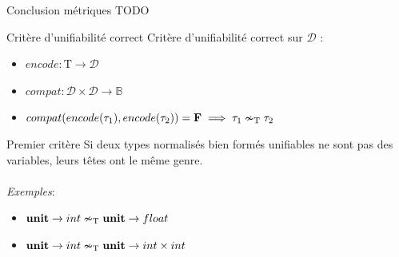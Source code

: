 \documentclass[serif]{beamer}
\newcommand{\exemples}{\textit{Exemples}\xspace}
\newcommand{\unit}{\bold{unit}}
\newcommand{\T}{\mathrm{T}}
\begin{document}

\begin{frame}{Conclusion métriques}
TODO
\end{frame}


\begin{frame}{Critère d'unifiabilité correct}
Critère d'unifiabilité correct sur $\mathscr{D}$ :
\begin{itemize}
	\item $encode : \T \rightarrow \mathscr{D}$
	\item $compat : \mathscr{D} \times \mathscr{D} \rightarrow \mathbb{B}$
	\item $compat (encode (\tau_1), encode (\tau_2)) = \bold{F} \implies \tau_1 \nsim_\T \tau_2$
\end{itemize}
\end{frame}


\begin{frame}{Premier critère}
Si deux types normalisés bien formés unifiables ne sont pas des variables, leurs têtes ont le même genre.
\\~\\
\exemples :
\begin{itemize}
	\item $\unit \rightarrow int \nsim_\T \unit \rightarrow float$
	\item $\unit \rightarrow int \nsim_\T \unit \rightarrow int \times int$
\end{itemize}
\end{frame}

\end{document}
